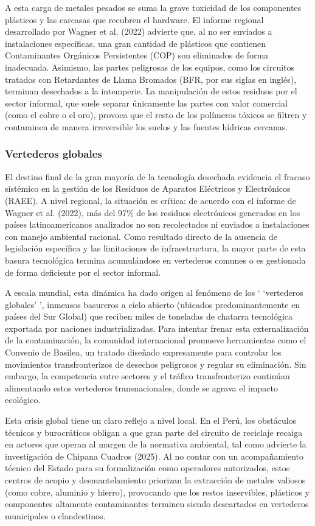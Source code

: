\documentclass[stu,12pt,a4paper]{apa7}
\begin{document}
A esta carga de metales pesados se suma la grave toxicidad de los componentes plásticos y las carcasas que recubren el hardware. El informe regional desarrollado por Wagner et al. (2022) advierte que, al no ser enviados a instalaciones específicas, una gran cantidad de plásticos que contienen Contaminantes Orgánicos Persistentes (COP) son eliminados de forma inadecuada. Asimismo, las partes peligrosas de los equipos, como los circuitos tratados con Retardantes de Llama Bromados (BFR, por sus siglas en inglés), terminan desechados a la intemperie. La manipulación de estos residuos por el sector informal, que suele separar únicamente las partes con valor comercial (como el cobre o el oro), provoca que el resto de los polímeros tóxicos se filtren y contaminen de manera irreversible los suelos y las fuentes hídricas cercanas.

    \subsubsection{Vertederos globales}
    El destino final de la gran mayoría de la tecnología desechada evidencia el fracaso sistémico en la gestión de los Residuos de Aparatos Eléctricos y Electrónicos (RAEE). A nivel regional, la situación es crítica: de acuerdo con el informe de Wagner et al. (2022), más del 97\% de los residuos electrónicos generados en los países latinoamericanos analizados no son recolectados ni enviados a instalaciones con manejo ambiental racional. Como resultado directo de la ausencia de legislación específica y las limitaciones de infraestructura, la mayor parte de esta basura tecnológica termina acumulándose en vertederos comunes o es gestionada de forma deficiente por el sector informal.
    
A escala mundial, esta dinámica ha dado origen al fenómeno de los ` `vertederos globales' ', inmensos basureros a cielo abierto (ubicados predominantemente en países del Sur Global) que reciben miles de toneladas de chatarra tecnológica exportada por naciones industrializadas. Para intentar frenar esta externalización de la contaminación, la comunidad internacional promueve herramientas como el Convenio de Basilea, un tratado diseñado expresamente para controlar los movimientos transfronterizos de desechos peligrosos y regular su eliminación. Sin embargo, la competencia entre sectores y el tráfico transfronterizo continúan alimentando estos vertederos transnacionales, donde se agrava el impacto ecológico.

Esta crisis global tiene un claro reflejo a nivel local. En el Perú, los obstáculos técnicos y burocráticos obligan a que gran parte del circuito de reciclaje recaiga en actores que operan al margen de la normativa ambiental, tal como advierte la investigación de Chipana Cuadros (2025). Al no contar con un acompañamiento técnico del Estado para su formalización como operadores autorizados, estos centros de acopio y desmantelamiento priorizan la extracción de metales valiosos (como cobre, aluminio y hierro), provocando que los restos inservibles, plásticos y componentes altamente contaminantes terminen siendo descartados en vertederos municipales o clandestinos.
\end{document}

